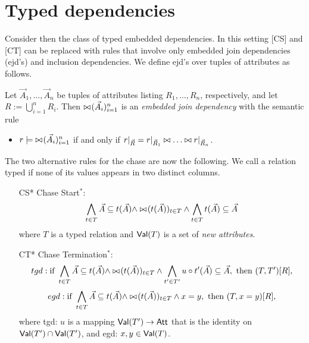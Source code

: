 \documentclass[envcountset]{llncs}
\newcommand{\problemFont}[1]{\protect\ensuremath{\mathsf{#1}}}
\newcommand{\sub}{\subseteq}
\newcommand{\tuple}[1]{\vec{#1}}
\newcommand{\ja}{\wedge}
\newcommand{\bow}[1]{\bowtie\hspace{-.6mm}(#1)}
\newcommand{\bo}{\bowtie}
\newcommand{\at}{\problemFont{Att}}
\newcommand\re[2]{{\left.\kern-\nulldelimiterspace #1 \vphantom{|} \right|_{#2} }}
\newcommand{\Val}{\problemFont{Val}}
\begin{document}
\section{Typed dependencies}
Consider then the class of typed embedded dependencies. In this setting [CS] and [CT] can be replaced with rules that involve only embedded join dependencies (ejd's) and inclusion dependencies. We define ejd's over tuples of attributes as follows.
\begin{definition}\label{joinatom}
Let $\tuple A_1, \ldots ,\tuple A_n$ be tuples of attributes listing $R_1, \ldots ,R_n$, respectively, and let $R:= \bigcup_{i=1}^n R_i$. Then $\bow{\tuple A_i}_{i=1}^n$ is an \emph{embedded join dependency} with the semantic rule
\begin{itemize}
\item $r \models\hspace{1mm} \bow{\tuple A_i}_{i=1}^n$ if and only if $\re{r}{ \tuple R} = \re{r}{  \tuple R_1}\bo \ldots \bo\re{r}{\tuple R_n}$.
\end{itemize}

\end{definition}
The two alternative rules for the chase are now the following. We call a relation  typed if none of its values appears in two distinct columns. 










\begin{itemize}
\item[CS*] Chase Start$^*$: $$\bigwedge_{t\in T }\tuple A \sub t(\tuple A) \wedge  \bow{t(\tuple A)}_{t\in T} \wedge \bigwedge_{t\in T } t(\tuple A) \sub \tuple A  $$
 where $T$ is a typed relation and $\Val(T)$ is a set of \emph{new attributes}.



\item[CT*] Chase Termination$^*$: 
$$tgd: \textrm{if } \bigwedge_{t\in T}  \tuple A\sub t(\tuple A)  \ja \bow{t(\tuple A)}_{t\in T} \ja \bigwedge_{t'\in T'}u\circ t'(\tuple A) \sub  \tuple A, \textrm{ then }(T,T')[R],
$$
$$egd: \textrm{if } \bigwedge_{t\in T}  \tuple A\sub t(\tuple A)  \ja \bow{t(\tuple A)}_{t\in T} \ja x=y, \textrm{ then }(T,x=y)[R],
$$
where tgd: $u$ is a mapping  $\Val(T')\to \at$ that is the identity on $\Val(T')\cap\Val(T')$, and egd: $x,y\in \Val(T)$.
\end{itemize}
\end{document}
